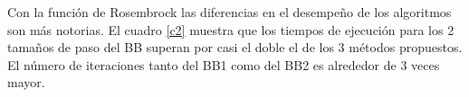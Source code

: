 \documentclass[conference]{IEEEtran}
\begin{document}
    \begin{table}[H]
    \centering
    \caption{Resultados promedio de 100 ejecuciones de los métodos con la Funcion Rosembrock}
    \label{c2}
    \end{table}

    Con la función de Rosembrock las diferencias en el desempeño de los algoritmos son más notorias. El cuadro \ref{c2} muestra que los tiempos de ejecución para los 2 tamaños de paso del BB superan por casi el doble el de los 3 métodos propuestos.\\

    El número de iteraciones tanto del BB1 como del BB2 es alrededor de 3 veces mayor.\\
\end{document}
